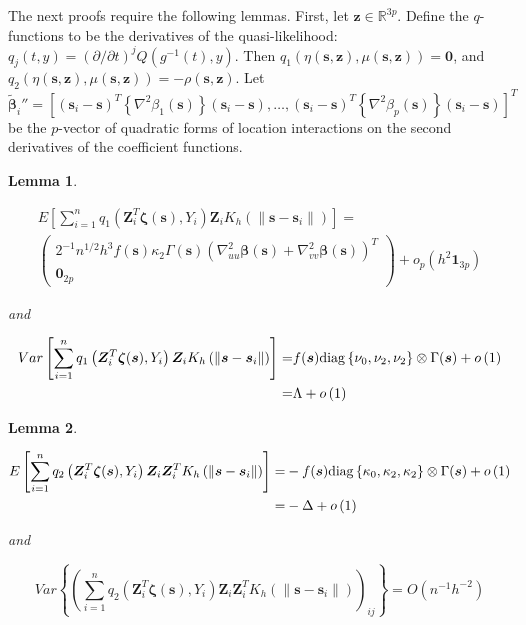 \documentclass[authoryear,review, 12pt]{elsarticle}
\newtheorem{lem}{Lemma}
\begin{document}
The next proofs require the following lemmas. First, let $\bm{z}\in\mathbb{R}^{3p}$.
Define the $q$-functions to be the derivatives of the quasi-likelihood:
$q_{j}(t,y)=\left(\partial/\partial t\right)^{j}Q\left(g^{-1}(t),y\right)$.
Then $q_{1}\left(\eta\left(\bm{s},\bm{z}\right),\mu\left(\bm{s},\bm{z}\right)\right)=\bm{0}$,
and $q_{2}\left(\eta\left(\bm{s},\bm{z}\right),\mu\left(\bm{s},\bm{z}\right)\right)=-\rho\left(\bm{s},\bm{z}\right)$.
Let $\tilde{\bm{\beta}}_{i}''=\left[\left(\bm{s}_{i}-\bm{s}\right)^{T}\left\{ \nabla^{2}\beta_{1}(\bm{s})\right\} \left(\bm{s}_{i}-\bm{s}\right),\dots,\left(\bm{s}_{i}-\bm{s}\right)^{T}\left\{ \nabla^{2}\beta_{p}(\bm{s})\right\} \left(\bm{s}_{i}-\bm{s}\right)\right]^{T}$
be the $p$-vector of quadratic forms of location interactions on
the second derivatives of the coefficient functions.
\begin{lem}
\label{lemma:omega}

\begin{multline*}
E\left[\sum_{i=1}^{n}q_{1}\left(\bm{Z}_{i}^{T}\bm{\zeta}(\bm{s}),Y_{i}\right)\bm{Z}_{i}K_{h}\left(\|\bm{s}-\bm{s}_{i}\|\right)\right]=\\
\left(\begin{array}{c}
2^{-1}n^{1/2}h^{3}f(\bm{s})\kappa_{2}\Gamma(\bm{s})\left(\nabla_{uu}^{2}\bm{\beta}(\bm{s})+\nabla_{vv}^{2}\bm{\beta}(\bm{s})\right)^{T}\\
\bm{0}_{2p}
\end{array}\right)+o_{p}\left(h^{2}\bm{1}_{3p}\right)
\end{multline*}


and

\begin{align*}
Var\left[\sum_{i=1}^{n}q_{1}\left(\bm{Z}_{i}^{T}\bm{\zeta}(\bm{s}),Y_{i}\right)\bm{Z}_{i}K_{h}\left(\|\bm{s}-\bm{s}_{i}\|\right)\right]= & f(\bm{s}){\rm diag}\left\{ \nu_{0},\nu_{2},\nu_{2}\right\} \otimes\Gamma(\bm{s})+o\left(1\right)\\
= & \Lambda+o\left(1\right)
\end{align*}

\end{lem}

\begin{lem}
\label{lemma:delta}

\begin{align*}
E\left[\sum_{i=1}^{n}q_{2}\left(\bm{Z}_{i}^{T}\bm{\zeta}(\bm{s}),Y_{i}\right)\bm{Z}_{i}\bm{Z}_{i}^{T}K_{h}\left(\|\bm{s}-\bm{s}_{i}\|\right)\right]= & -f(\bm{s}){\rm diag}\left\{ \kappa_{0},\kappa_{2},\kappa_{2}\right\} \otimes\Gamma(\bm{s})+o\left(1\right)\\
= & -\Delta+o\left(1\right)
\end{align*}


and

\[
Var\left\{ \left(\sum_{i=1}^{n}q_{2}\left(\bm{Z}_{i}^{T}\bm{\zeta}(\bm{s}),Y_{i}\right)\bm{Z}_{i}\bm{Z}_{i}^{T}K_{h}\left(\|\bm{s}-\bm{s}_{i}\|\right)\right)_{ij}\right\} =O\left(n^{-1}h^{-2}\right)
\]

\end{lem}
\end{document}
